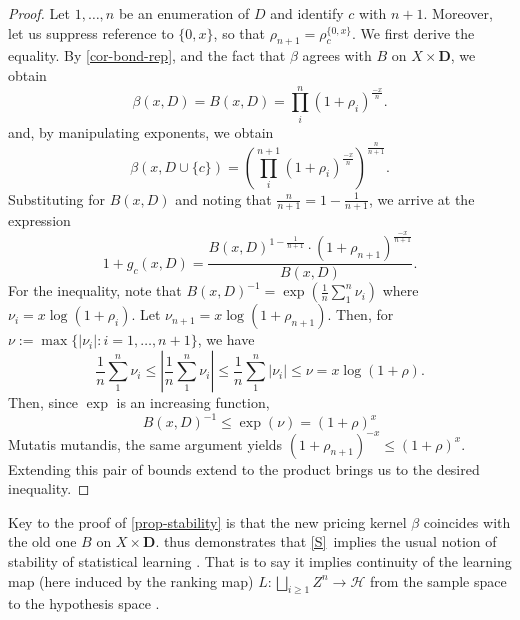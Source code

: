 \documentclass[ecta,nameyear,draft]{econsocart}
\newcommand{\mc}{\mathcal}
\newcommand{\mbbd}{{\mathbf D}}
\newcommand{\stability}{\ref{S}}
\theoremstyle{plain}
\theoremstyle{remark}
\begin{document}
\begin{proof}
  Let $1, \dots, n$ be an enumeration of $D$ and identify $c$ with $n+1$.
  Moreover, let us suppress reference to $\{0, x\}$, so that $\rho_{n+1} =
  \rho_{c}^{\{0, x\}}$. We first derive the equality. By \cref{cor-bond-rep},
  and the fact that $\beta$ agrees with $B$ on $X \times \mbbd$, we obtain 
  \begin{equation*} \beta(x, D) = B(x, D) =
    \prod_{i}^{n} \left(1 + \rho_{i}\right)^\frac{-x}{n} .
  \end{equation*}
  and, by manipulating exponents, we obtain
  \begin{equation*}\beta(x, D \cup \{c\}) =
    \left(\prod_{i}^{n+1} \left(1 +
    \rho_{i}\right)^\frac{-x}{n}\right)^\frac{n}{n+1}.
  \end{equation*}
  Substituting for $B(x, D)$ and noting that $\frac{n}{n+1} = 1 -
  \frac{1}{n+1}$, we arrive at the expression
  \begin{equation*}
    1 + g_c(x, D) = \frac{B(x, D)^{1 - \frac{1}{n+1}} \cdot \left (1 +
    \rho_{n+1} \right)^\frac{-x}{n+1}}{B(x, D)}.  
  \end{equation*}
  For the inequality, note that $B(x, D)^{-1} = \exp(\frac{1}{n}\sum_{1}^{n}
  \nu_i)$ where $\nu_i = x\log(1+\rho_i)$. Let $\nu_{n+1} = x \log(1 +
  \rho_{n+1})$.  Then, for $\nu := \max\{\lvert \nu_i \rvert : i = 1, \dots,
  n+1\}$, we have
  \begin{equation*}
    \frac{1}{n}\sum_{1}^{n} \nu_i \leq \left \lvert \frac{1}{n}\sum_{1}^{n}
    \nu_i\right \rvert \leq \frac{1}{n} \sum_1^n \lvert \nu_i \rvert \leq \nu =
    x \log (1 + \rho).
  \end{equation*}
  Then, since $\exp$ is an increasing function,
  \begin{equation*}
    B(x, D)^{-1} \leq \exp (\nu) = (1 + \rho)^{x}
  \end{equation*}
  Mutatis mutandis, the same argument yields $(1 + \rho_{n+1})^{-x} \leq (1 +
  \rho)^{x}$. Extending this pair of bounds extend to the product brings us to
  the desired inequality. 
\end{proof}

Key to the proof of \cref{prop-stability} is that the new pricing kernel
$\beta$ coincides with the old one $B$ on $X \times \mbbd$.
 thus demonstrates that \stability\ implies the usual
notion of stability of statistical learning
\citep{poggio2004general,mukherjee2006learning,bousquet2002stability}. That is
to say it implies continuity of the learning map (here induced by the ranking
map) $L:\bigsqcup_{i \geq 1} Z^n \rightarrow \mc H$ from the sample space to
the hypothesis space \citep{mukherjee2006learning}.  
\end{document}
